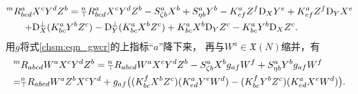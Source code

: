 \begin{align}
    {}^{m}{R}^a_{bcd}& X^c Y^d Z^b %
    = {}^{n}_{\top}{R}^a_{bcd} X^c Y^d Z^b - S^a_{\zeta b} X^b + S^a_{\eta b} Y^b
    - K^a_{ef} Z^f {\rm D}_{X} Y^e + K^a_{ef} Z^f {\rm D}_{Y} X^e  \notag \\
    +& {\rm D}^\bot_{X} (K^{a}_{bc} Y^b Z^c) -{\rm D}^\bot_{Y} (K^{a}_{bc} X^b Z^c)
    + K^{a}_{bc}X^b {\rm D}_{Y}Z^c - K^{a}_{bc}Y^b {\rm D}_{X}Z^c. \label{chsm:eqn_gwcr}
\end{align}
\setlength{\mathindent}{2em}
用${g}$将式\eqref{chsm:eqn_gwcr}的上指标“$a$”降下来，
再与$W^a\in \mathfrak{X}(N)$缩并，有 %
\setlength{\mathindent}{0em}
\begin{align}
        {}^{m}&{R}_{abcd} W^a X^c Y^d Z^b ={}^{n}_{\top}{R}_{abcd} W^a X^c Y^d Z^b
    - S^a_{\zeta b} X^b g_{af}W^f + S^a_{\eta b} Y^b g_{af}W^f \label{chsm:eqn_curvature-Gauss-0} \\
     = &{}^{n}_{\top}{R}_{abcd} W^a Z^b X^c Y^d
     + {g}_{af} \bigl( (K^f_{bc} X^b Z^c) (K^a_{ed} Y^e W^d)
     -(K^f_{bc} Y^b Z^c) (K^a_{ed} X^e W^d) \bigr) .   \notag
\end{align}

